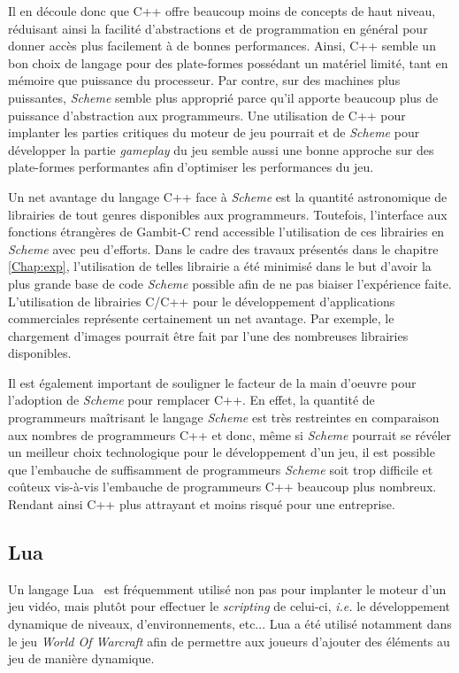 \documentclass[12pt,twoside,letterpaper,francais]{book}
\newcommand{\ie}{{\textit{i.e. }}}
\newcommand{\Schemelang}{{\textit{Scheme }}}
\begin{document}
Il en découle donc que C++ offre beaucoup moins de concepts de haut
niveau, réduisant ainsi la facilité d'abstractions et de programmation
en général pour donner accès plus facilement à de bonnes
performances. Ainsi, C++ semble un bon choix de langage pour des
plate-formes possédant un matériel limité, tant en mémoire que
puissance du processeur. Par contre, sur des machines plus puissantes,
\Schemelang semble plus approprié parce qu'il apporte beaucoup plus de
puissance d'abstraction aux programmeurs. Une utilisation de C++ pour
implanter les parties critiques du moteur de jeu pourrait et de \Schemelang
pour développer la partie \textit{gameplay} du jeu semble aussi une
bonne approche sur des plate-formes performantes afin d'optimiser les
performances du jeu.

Un net avantage du langage C++ face à \Schemelang est la quantité
astronomique de librairies de tout genres disponibles aux
programmeurs. Toutefois, l'interface aux fonctions étrangères de
Gambit-C rend accessible l'utilisation de ces librairies en \Schemelang
avec peu d'efforts. Dans le cadre des travaux présentés dans le
chapitre \ref{Chap:exp}, l'utilisation de telles librairie a été
minimisé dans le but d'avoir la plus grande base de code \Schemelang
possible afin de ne pas biaiser l'expérience faite. L'utilisation de
librairies C/C++ pour le développement d'applications commerciales
représente certainement un net avantage. Par exemple, le chargement
d'images pourrait être fait par l'une des nombreuses librairies
disponibles.

Il est également important de souligner le facteur de la main d'oeuvre
pour l'adoption de \Schemelang pour remplacer C++. En effet, la quantité de
programmeurs maîtrisant le langage \Schemelang est très restreintes en
comparaison aux nombres de programmeurs C++ et donc, même si \Schemelang
pourrait se révéler un meilleur choix technologique pour le
développement d'un jeu, il est possible que l'embauche de suffisamment
de programmeurs \Schemelang soit trop difficile et coûteux vis-à-vis
l'embauche de programmeurs C++ beaucoup plus nombreux. Rendant ainsi
C++ plus attrayant et moins risqué pour une entreprise.


\FloatBarrier
\subsection{Lua}
Un langage Lua~\cite{Lua} est fréquemment utilisé non pas pour
implanter le moteur d'un jeu vidéo, mais plutôt pour effectuer le
\textit{scripting} de celui-ci, \ie le développement dynamique de
niveaux, d'environnements, etc... Lua a été utilisé notamment dans le
jeu \textit{World Of Warcraft} afin de permettre aux joueurs d'ajouter
des éléments au jeu de manière dynamique.
\end{document}

